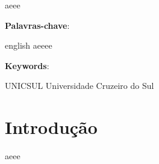 \documentclass[12pt]{abntex2}
\begin{document}
\begin{resumo} 
aeee
\vspace{\onelineskip} 
\noindent

\textbf{Palavras-chave}:  
\end{resumo} 

\begin{resumo}[Abstract] 
\begin{otherlanguage*}{english}
aeeee
\vspace{\onelineskip} 
\noindent 

\textbf{Keywords}: 
\end{otherlanguage*} 
\end{resumo} 
\begin{siglas} 
\item[UNICSUL] Universidade Cruzeiro do Sul 
\end{siglas}

\listoffigures

\listoftables 

\tableofcontents* %

\chapter{Introdução}

aeee
\end{document}
